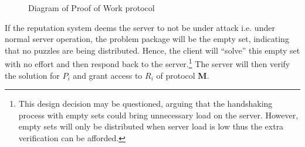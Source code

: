 \begin{figure}[H]
	\begin{center}
		 \vspace{10pt}
		\caption{Diagram of Proof of Work protocol}\label{tab:protocol}
	 \end{center}
\end{figure}
If the reputation system deems the server to not be under attack i.e. under normal server operation, the problem package will be the empty set, indicating that no puzzles are being distributed.
Hence, the client will ``solve'' this empty set with no effort and then respond back to the server.\footnote{This design decision may be questioned, arguing that the handshaking process with empty sets could bring unnecessary load on the server.
However, empty sets will only be distributed when server load is low thus the extra verification can be afforded.}
The server will then verify the solution for $P_i$ and grant access to $R_i$ of protocol \textbf{M}.


